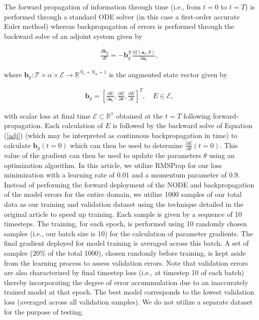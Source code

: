 \documentclass[preprint,12pt]{elsarticle}
\begin{document}
The forward propagation of information through time (i.e., from $t=0$ to $t=T$) is performed through a standard ODE solver (in this case a first-order accurate Euler method) whereas backpropagation of errors is performed through the backward solve of an adjoint system given by
\begin{linenomath*}
\begin{align}
\label{adj}
\frac{d \mathbf{b}_g}{d t}=-\mathbf{b}_g^{\mathrm{T}} \frac{\partial f(\mathbf{a}_r, \theta)}{\partial \mathbf{a}_r},
\end{align}
\end{linenomath*}
where $\mathbf{b}_g : \mathcal{T} \times \alpha \times \mathcal{E} \rightarrow \mathbb{R}^{N_r + N_w + 1}$ is the augmented state vector given by 
\begin{linenomath*}
\begin{align}
\mathbf{b}_g = [\frac{\partial E}{\partial \mathbf{a}_r}, \frac{\partial E}{\partial \theta}, \frac{\partial E}{\partial t}]^T, \quad E \in \mathcal{E},
\end{align}
\end{linenomath*}
with scalar loss at final time $\mathcal{E} \subset \mathbb{R}^1$ obtained at the $t=T$ following forward-propagation. Each calculation of $E$ is followed by the backward solve of Equation (\ref{adj}) (which may be interpreted as continuous backpropagation in time) to calculate $\mathbf{b}_g (t=0)$ which can then be used to determine $\frac{\partial E}{\partial \theta} (t=0)$. This value of the gradient can then be used to update the parameters $\theta$ using an optimization algorithm. In this article, we utilize RMSProp for our loss minimization with a learning rate of 0.01 and a momentum parameter of 0.9. Instead of performing the forward deployment of the NODE and backpropagation of the model errors for the entire domain, we utilize 1000 samples of our total data as our training and validation dataset using the technique detailed in the original article to speed up training. Each sample is given by a sequence of 10 timesteps. The training, for each epoch, is performed using 10 randomly chosen samples (i.e., our batch size is 10) for the calculation of parameter gradients. The final gradient deployed for model training is averaged across this batch. A set of samples (20\% of the total 1000), chosen randomly before training, is kept aside from the learning process to assess validation errors. Note that validation errors are also characterized by final timestep loss (i.e., at timestep 10 of each batch) thereby incorporating the degree of error accummulation due to an inaccurately trained model at that epoch. The best model corresponds to the lowest validation loss (averaged across all validation samples). We do not utilize a separate dataset for the purpose of testing. 
\end{document}
